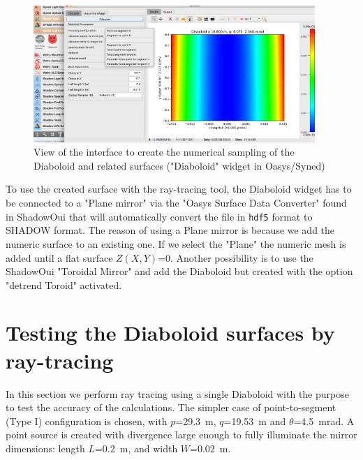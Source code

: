 \documentclass{iucr}              %
\begin{document}
\begin{figure}[h]
\centering
\includegraphics[width=0.95\textwidth]{figures/widget.png}
\caption{\label{fig:widget}View of the interface to create the numerical sampling of the Diaboloid and related surfaces ("Diaboloid" widget in Oasys/Syned) }
\end{figure}

To use the created surface with the ray-tracing tool, the Diaboloid widget has to be connected to a "Plane mirror" via the "Oasys Surface Data Converter" found in ShadowOui that will automatically convert the file in {\tt hdf5} format to SHADOW format. The reason of using a Plane mirror is because we add the numeric surface to an existing one. If we select the "Plane" the numeric mesh is added until a flat surface $Z(X,Y)$=0. Another possibility is to use the ShadowOui "Toroidal Mirror" and add the Diaboloid but created with the option "detrend Toroid" activated.  

\section{Testing the Diaboloid surfaces by ray-tracing}
\label{sec:testing}

In this section we perform ray tracing using a single Diaboloid with the purpose to test the accuracy of the calculations. The simpler case of point-to-segment (Type I) configuration is chosen, with $p$=29.3~m, $q$=19.53~m and $\theta$=4.5~mrad. A point source is created with divergence large enough to fully illuminate the mirror dimensions: 
length $L$=0.2~m, and width $W$=0.02~m.
\end{document}
